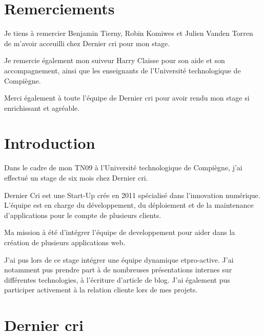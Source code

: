 \newpage

\section{Remerciements}\label{remerciements}

\bigskip

Je tiens à remercier Benjamin Tierny, Robin Komiwes et Julien Vanden
Torren de m'avoir acceuilli chez Dernier cri pour mon stage.

\bigskip

Je remercie également mon suiveur Harry Claisse pour son aide et son
accompagnement, ainsi que les enseignants de l'Université technologique
de Compiègne.

\bigskip

Merci également à toute l'équipe de Dernier cri pour avoir rendu mon
stage si enrichissant et agréable.

\newpage

\section{Introduction}\label{introduction}

\bigskip

Dans le cadre de mon TN09 à l'Université technologique de Compiègne,
j'ai effectué un stage de six mois chez Dernier cri.

\bigskip

Dernier Cri est une Start-Up crée en 2011 spécialisé dans l'innovation
numérique. L'équipe est en charge du développement, du déploiement et de
la maintenance d'applications pour le compte de plusieurs clients.

\bigskip

Ma mission à été d'intégrer l'équipe de developpement pour aider dans la
création de plusieurs applications web.

\bigskip

J'ai pus lors de ce stage intégrer une équipe dynamique etpro-active.
J'ai notamment pus prendre part à de nombreuses présentations internes
sur différentes technologies, à l'écriture d'article de blog. J'ai
également pus participer activement à la relation cliente lors de mes
projets.

\newpage

\section{Dernier cri}\label{dernier-cri}

